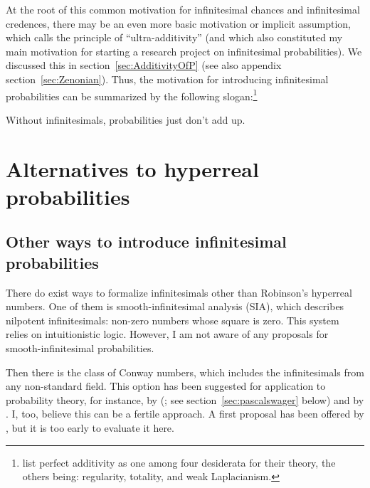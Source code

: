 At the root of this common motivation for infinitesimal chances and infinitesimal credences, there may be an even more basic motivation or implicit assumption, which \citet{Skyrms:1983a} calls the principle of ``ultra-additivity'' (and which also constituted my main motivation for starting a research project on infinitesimal probabilities). We discussed this in section~\ref{sec:AdditivityOfP} (see also appendix section~\ref{sec:Zenonian}).
Thus, the motivation for introducing infinitesimal probabilities can be summarized by the following slogan:\footnote{\citet{Benci_etal:2018} list perfect additivity as one among four desiderata for their theory, the others being: regularity, totality, and weak Laplacianism.}
\begin{center}
Without infinitesimals, probabilities just don't add up.
\end{center}

\section{Alternatives to hyperreal probabilities}\label{sec:OtherApproaches}
\subsection{Other ways to introduce infinitesimal probabilities}
There do exist ways to formalize infinitesimals other than Robinson's hyperreal numbers. One of them is smooth-infinitesimal analysis (SIA), which describes nilpotent infinitesimals: non-zero numbers whose square is zero. This system relies on intuitionistic logic. However, I am not aware of any proposals for smooth-infinitesimal probabilities.

Then there is the class of Conway numbers, which includes the infinitesimals from any non-standard field. This option has been suggested for application to probability theory, for instance, by \citeauthor{Hajek:2003b} (\citeyear{Hajek:2003b}; see section~\ref{sec:pascalswager} below) and
by \citet{Easwaran:2014}. I, too, believe this can be a fertile approach. A first proposal has been offered by \citet{ChenRubio:forthc}, but it is too early to evaluate it here.


